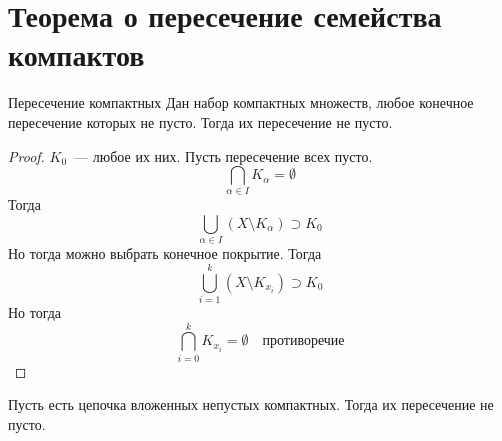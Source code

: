 \section{Теорема о пересечение семейства компактов}
\begin{theorem}{Пересечение компактных}
Дан набор компактных множеств, любое конечное пересечение которых не пусто. Тогда их пересечение не пусто.
\end{theorem}
\begin{proof}
$K_0$~--- любое их них. Пусть пересечение всех пусто. 
$$\bigcap_{\alpha\in I} K_\alpha = \emptyset$$
Тогда 
$$\bigcup_{\alpha\in I} \left(X \setminus K_\alpha\right) \supset K_0$$
Но тогда можно выбрать конечное покрытие. Тогда 
$$\bigcup_{i=1}^k \left(X \setminus K_{x_i}\right) \supset K_0$$
Но тогда 
$$\bigcap_{i=0}^k K_{x_i} = \emptyset \quad\text{противоречие}$$
\end{proof}

\begin{conseq}
Пусть есть цепочка вложенных непустых компактных. Тогда их пересечение не пусто.
\end{conseq}